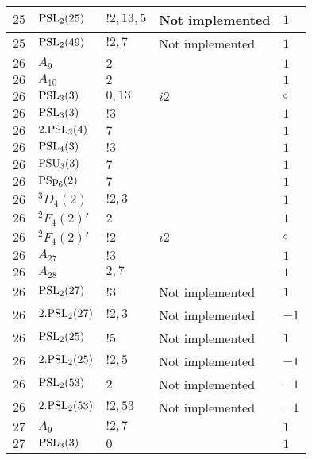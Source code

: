 \documentclass[a4paper, 11pt]{article}
\begin{document}
\begin{longtable}{lllll}
        $ 25 $ & $ {\rm PSL}_{2}(25) $ & $ !2, 13, 5 $ &  Not implemented & $ 1$ \\ \hline
        $ 25 $ & $ {\rm PSL}_{2}(49) $ & $ !2, 7 $ &  Not implemented & $ 1$ \\ \hline
        $ 26 $ & $ A_{9} $ & $ 2 $ & $ ~ $ & $ 1$ \\ \hline
        $ 26 $ & $ A_{10} $ & $ 2 $ & $ ~ $ & $ 1$ \\ \hline
        $ 26 $ & $ {\rm PSL}_{3}(3) $ & $ 0,13 $ & $ i2 $ &  $\circ$ \\ \hline
        $ 26 $ & $ {\rm PSL}_{3}(3) $ & $ ! 3 $ & $ ~ $ & $ 1$ \\ \hline
        $ 26 $ & $ 2.{\rm PSL}_{3}(4) $ & $ 7 $ & $ ~ $ & $ 1$ \\ \hline
        $ 26 $ & $ {\rm PSL}_{4}(3) $ & $ ! 3 $ & $ ~ $ & $ 1$ \\ \hline
        $ 26 $ & $ {\rm PSU}_{3}(3) $ & $ 7 $ & $ ~ $ & $ 1$ \\ \hline
        $ 26 $ & $ {\rm PSp}_{6}(2) $ & $ 7 $ & $ ~ $ & $ 1$ \\ \hline
        $ 26 $ & $ {}^3D_{4}(2) $ & $ ! 2,3 $ & $ ~ $ & $ 1$ \\ \hline
        $ 26 $ & $ {}^2F_4(2)' $ & $ 2 $ & $ ~ $ & $ 1$ \\ \hline
        $ 26 $ & $ {}^2F_4(2)' $ & $ ! 2 $ & $ i2 $ &  $\circ$ \\ \hline
        $ 26 $ & $ A_{27} $ & $ !3 $ & $ ~ $ & $ 1$ \\ \hline
        $ 26 $ & $ A_{28} $ & $ 2, 7 $ & $ ~ $ & $ 1$ \\ \hline
        $ 26 $ & $ {\rm PSL}_{2}(27) $ & $ !3 $ &  Not implemented & $ 1$ \\ \hline
        $ 26 $ & $ 2.{\rm PSL}_{2}(27) $ & $ !2, 3 $ &  Not implemented & $ -1$ \\ \hline
        $ 26 $ & $ {\rm PSL}_{2}(25) $ & $ !5 $ &  Not implemented & $ 1$ \\ \hline
        $ 26 $ & $ 2.{\rm PSL}_{2}(25) $ & $ !2, 5 $ &  Not implemented & $ -1$ \\ \hline
        $ 26 $ & $ {\rm PSL}_{2}(53) $ & $ 2 $ &  Not implemented & $ -1$ \\ \hline
        $ 26 $ & $ 2.{\rm PSL}_{2}(53) $ & $ !2, 53 $ &  Not implemented & $ -1$ \\ \hline
        $ 27 $ & $ A_{9} $ & $ ! 2,7 $ & $ ~ $ & $ 1$ \\ \hline
        $ 27 $ & $ {\rm PSL}_{3}(3) $ & $ 0 $ & $ ~ $ & $ 1$ \\ \hline

\end{longtable}
\end{document}
